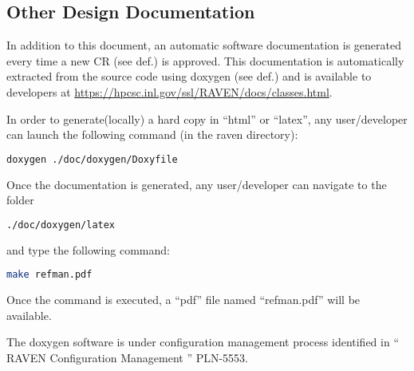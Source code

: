 \subsection{Other Design Documentation}

In addition to this document, an automatic software documentation
is generated every time a new CR (see def.) is approved. This
documentation is automatically extracted from the source code using
doxygen (see def.) and is available to developers at
\url{https://hpcsc.inl.gov/ssl/RAVEN/docs/classes.html}.

In order to generate(locally) a hard copy in ``html'' or ``latex'', any user/developer can 
launch the 
following command (in the raven directory):
\begin{lstlisting}[language=bash]
doxygen ./doc/doxygen/Doxyfile
\end{lstlisting}
Once the documentation is generated, any user/developer can navigate to the folder
\begin{lstlisting}[language=bash]
./doc/doxygen/latex
\end{lstlisting}
and type the following command:
\begin{lstlisting}[language=bash]
make refman.pdf
\end{lstlisting}
Once the command is executed, a ``pdf'' file named ``refman.pdf'' will be available.

The doxygen software is under configuration management process identified in
`` RAVEN Configuration Management '' PLN-5553.
